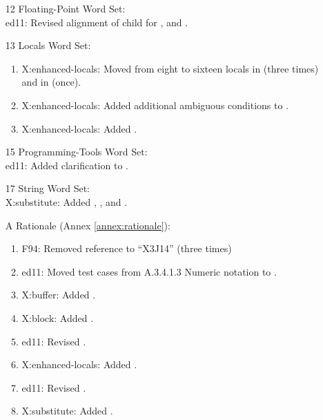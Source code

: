 \begin{itemize}
	\item[12] Floating-Point Word Set: \\		%
		\textsf{ed11}: Revised alignment of child for
			,
			 and
			.

	\item[13] Locals Word Set:						%
		\begin{enumerate}
		\item \textsf{X:enhanced-locals}:
			Moved from eight to sixteen locals in
			 (three times)
			and in  (once).
		\item \textsf{X:enhanced-locals}:
			Added additional ambiguous conditions to
			.
		\item \textsf{X:enhanced-locals}:
			Added .
		\end{enumerate}

	\item[15] Programming-Tools Word Set: \\	%
		\textsf{ed11}: Added clarification to .

	\item[17] String Word Set: \\					%
		\textsf{X:substitute}:
			Added ,
			,
			 and
			.

	\item[A] Rationale								(Annex \ref{annex:rationale}):
		\begin{enumerate}
		\item \textsf{F94}: Removed reference to ``X3J14'' (three times)
		\item \textsf{ed11}: Moved test cases from A.3.4.1.3 Numeric notation to .
		\item \textsf{X:buffer}: Added .
		\item \textsf{X:block}: Added .
		\item \textsf{ed11}: Revised .
		\item \textsf{X:enhanced-locals}:
			Added .
		\item \textsf{ed11}: Revised .
		\item \textsf{X:substitute}: Added .
		\end{enumerate}
		

\end{itemize}
